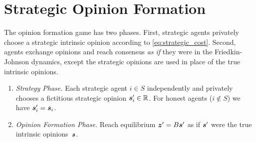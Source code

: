 
\section{Strategic Opinion Formation}\label{sec:strategic_opinion_formation}




The opinion formation game has two phases. First, strategic agents privately choose a strategic intrinsic opinion according to \cref{eq:strategic_cost}. Second, agents exchange opinions and reach consensus {\em as if} they were in the Friedkin-Johnson dynamics, except the strategic opinions are used in place of the true intrinsic opinions. 
\begin{enumerate}
    \item {\em Strategy Phase.} Each strategic agent $i \in S$ independently and privately chooses a fictitious strategic opinion $\bm{s}_i^\prime \in \mathbb{R}$. For honest agents ($i \notin S$) we have $\bm{s}_i^\prime = \bm{s}_i$.
    \item {\em Opinion Formation Phase.} Reach equilibrium $\bm{z}^\prime = B \bm{s}^\prime$ as if $\bm{s}^\prime$ were the true intrinsic opinions~$\bm{s}$. 
\end{enumerate}

